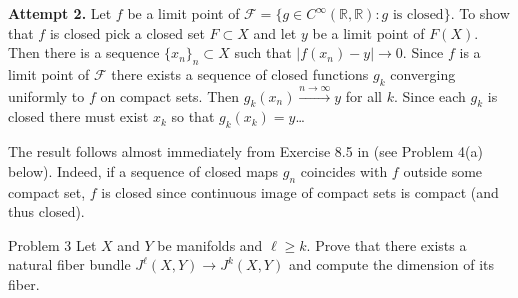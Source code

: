 \textbf{Attempt 2.} \hspace{.5em}  Let \(f \) be a limit point of \(\mathcal{F}=\{g\in C^\infty(\mathbb{R},\mathbb{R}):g\text{ is closed} \}\). To show that \(f\) is closed pick a closed set \(F \subset X\) and let \(y\) be a limit point of  \(F(X)\). Then there is a sequence \(\{x_n\}_n \subset X\) such that \(|f(x_n)-y| \to 0\). Since \(f\) is a limit point of \(\mathcal{F}\) there exists a sequence of closed functions \(g_k\) converging uniformly to \(f\) on compact sets. Then \(g_k(x_n) \xrightarrow{n\to \infty} y\) for all \(k\). Since each \(g_k\) is closed there must exist \(x_k\) so that \(g_k(x_k) =y\)…

\begin{remark}\leavevmode
The result follows almost immediately from Exercise 8.5 in \cite{muk} (see Problem 4(a) below). Indeed, if a sequence of closed maps \(g_n\) coincides with \(f\) outside some compact set, \(f\) is closed since continuous image of compact sets is compact (and thus closed).
\end{remark}

\begin{thing1}{Problem 3}\label{prob:3}\leavevmode
Let \(X\) and \(Y\) be manifolds and \(\ell \geq  k\). Prove that there exists a natural fiber bundle \(J^\ell(X,Y) \to J^k(X,Y)\) and compute the dimension of its fiber.
\end{thing1}

